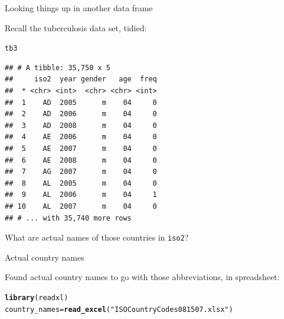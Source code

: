 \documentclass[unknownkeysallowed]{beamer}\usepackage[]{graphicx}\usepackage[]{color}
\makeatletter
\newcommand{\hlstr}[1]{\textcolor[rgb]{0.192,0.494,0.8}{#1}}%
\newcommand{\hlstd}[1]{\textcolor[rgb]{0.345,0.345,0.345}{#1}}%
\newcommand{\hlkwb}[1]{\textcolor[rgb]{0.69,0.353,0.396}{#1}}%
\newcommand{\hlkwd}[1]{\textcolor[rgb]{0.737,0.353,0.396}{\textbf{#1}}}%
\newenvironment{kframe}{%
 \def\at@end@of@kframe{}%
 \ifinner\ifhmode%
  \def\at@end@of@kframe{\end{minipage}}%
  \begin{minipage}{\columnwidth}%
 \fi\fi%
 \def\FrameCommand##1{\hskip\@totalleftmargin \hskip-\fboxsep
 \colorbox{shadecolor}{##1}\hskip-\fboxsep
     \hskip-\linewidth \hskip-\@totalleftmargin \hskip\columnwidth}%
 \MakeFramed {\advance\hsize-\width
   \@totalleftmargin\z@ \linewidth\hsize
   \@setminipage}}%
 {\par\unskip\endMakeFramed%
 \at@end@of@kframe}
\newenvironment{knitrout}{}{} %
\makeatother
\begin{document}
\begin{frame}[fragile]{Looking things up in another data frame}
  
  Recall the tuberculosis data set, tidied:
  
\begin{knitrout}\footnotesize
{}\color{fgcolor}\begin{kframe}
\begin{alltt}
\hlstd{tb3}
\end{alltt}
\begin{verbatim}
## # A tibble: 35,750 x 5
##     iso2  year gender   age  freq
##  * <chr> <int>  <chr> <chr> <int>
##  1    AD  2005      m    04     0
##  2    AD  2006      m    04     0
##  3    AD  2008      m    04     0
##  4    AE  2006      m    04     0
##  5    AE  2007      m    04     0
##  6    AE  2008      m    04     0
##  7    AG  2007      m    04     0
##  8    AL  2005      m    04     0
##  9    AL  2006      m    04     1
## 10    AL  2007      m    04     0
## # ... with 35,740 more rows
\end{verbatim}
\end{kframe}
\end{knitrout}

What are actual names of those countries in \texttt{iso2}?
  
\end{frame}

\begin{frame}[fragile]{Actual country names}
  
  Found actual country names to go with those abbreviations, in spreadsheet:
  
\begin{knitrout}
\color{fgcolor}\begin{kframe}
\begin{alltt}
\hlkwd{library}\hlstd{(readxl)}
\hlstd{country_names}\hlkwb{=}\hlkwd{read_excel}\hlstd{(}\hlstr{"ISOCountryCodes081507.xlsx"}\hlstd{)}
\end{alltt}
\end{kframe}
\end{knitrout}
  
\end{frame}
\end{document}
